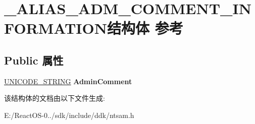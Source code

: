 \hypertarget{struct___a_l_i_a_s___a_d_m___c_o_m_m_e_n_t___i_n_f_o_r_m_a_t_i_o_n}{}\section{\+\_\+\+A\+L\+I\+A\+S\+\_\+\+A\+D\+M\+\_\+\+C\+O\+M\+M\+E\+N\+T\+\_\+\+I\+N\+F\+O\+R\+M\+A\+T\+I\+O\+N结构体 参考}
\label{struct___a_l_i_a_s___a_d_m___c_o_m_m_e_n_t___i_n_f_o_r_m_a_t_i_o_n}
\subsection*{Public 属性}
\begin{DoxyCompactItemize}
\item 
\mbox{\label{struct___a_l_i_a_s___a_d_m___c_o_m_m_e_n_t___i_n_f_o_r_m_a_t_i_o_n_a3009fb57fa072ef173954184bc8e20bc}} 
\hyperlink{struct___u_n_i_c_o_d_e___s_t_r_i_n_g}{U\+N\+I\+C\+O\+D\+E\+\_\+\+S\+T\+R\+I\+NG} {\bfseries Admin\+Comment}
\end{DoxyCompactItemize}


该结构体的文档由以下文件生成\+:\begin{DoxyCompactItemize}
\item 
E\+:/\+React\+O\+S-\/0../sdk/include/ddk/ntsam.\+h\end{DoxyCompactItemize}
